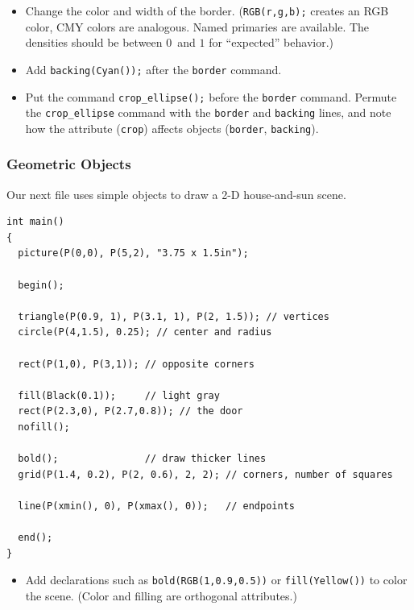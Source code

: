 \documentclass[12pt,letterpaper]{book}
\newcommand{\code}[1]{\texttt{#1}}
\newcommand{\teximath}[1]{$#1$}
\begin{document}
\begin{itemize}

\item Change the color and width of the
  border. (\code{RGB(r,g,b);} creates an RGB color, CMY colors are
  analogous. Named primaries are available. The densities should be
  between \teximath{0}~and \teximath{1} for ``expected'' behavior.)

\item Add \code{backing(Cyan());} after the \code{border} command. 

\item Put the command \code{crop\_ellipse();} before the \code{border}
  command. Permute the \code{crop\_ellipse} command with the
  \code{border} and \code{backing} lines, and note how the attribute
  (\code{crop}) affects objects (\code{border}, \code{backing}).

\end{itemize}


\subsubsection*{Geometric Objects}

Our next file uses simple objects to draw a 2-D house-and-sun scene.

\begin{verbatim}
int main()
{
  picture(P(0,0), P(5,2), "3.75 x 1.5in");

  begin();

  triangle(P(0.9, 1), P(3.1, 1), P(2, 1.5)); // vertices
  circle(P(4,1.5), 0.25); // center and radius

  rect(P(1,0), P(3,1)); // opposite corners

  fill(Black(0.1));     // light gray
  rect(P(2.3,0), P(2.7,0.8)); // the door
  nofill();

  bold();               // draw thicker lines
  grid(P(1.4, 0.2), P(2, 0.6), 2, 2); // corners, number of squares

  line(P(xmin(), 0), P(xmax(), 0));   // endpoints

  end();
}
\end{verbatim}

\begin{center}
  
\end{center}

\begin{itemize}

\item Add declarations such as \code{bold(RGB(1,0.9,0.5))} or
  \code{fill(Yellow())} to color the scene. (Color and filling are
  orthogonal attributes.)
\end{itemize}
\end{document}
